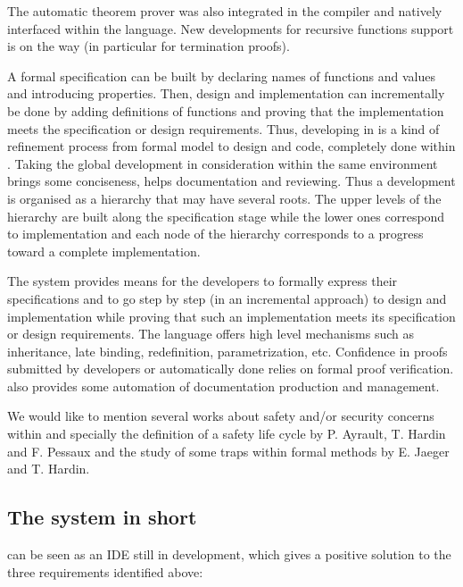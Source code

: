 The {\zenon} automatic theorem prover was also integrated in the
compiler and natively interfaced within the {\focalize} language. New
developments for recursive functions support is on the way (in particular for
termination proofs).

A formal specification can be built by declaring names of functions
and values and introducing
properties. Then, design and implementation can incrementally be done
by adding definitions of functions and proving that the implementation
meets the specification or design requirements. Thus, developing in
{\focalize} is a kind of refinement process from  formal model to design
and code, completely done within {\focalize}. Taking the global development
in consideration within the same environment brings some conciseness,
helps documentation and reviewing.
Thus a {\focalize} development is organised as a hierarchy that may have
several roots. The upper levels of the hierarchy are built along the
specification stage while the lower ones correspond to
implementation and each  node of the hierarchy corresponds to a progress
toward a complete implementation.

The {\focalize} system provides means for the developers to formally express
their specifications and to go step by step (in an incremental approach) to
design and implementation while proving that such an implementation
meets its specification or design requirements. The {\focalize} language offers
high level mechanisms such as inheritance, late binding, redefinition,
parametrization, etc.  Confidence in proofs submitted by developers or
automatically done relies on formal proof verification. {\focalize} also
provides some automation of documentation production and management.

We would like to mention several works about safety and/or security
concerns within {\focalize} and specially the definition of a safety life
cycle by P. Ayrault, T. Hardin and F. Pessaux \cite{TTSS08} and the
study of some traps within formal methods by E. Jaeger and
T. Hardin\cite{traps}.

\subsection*{The {\focalize} system in short}

{\focalize} can be seen as an IDE still in development, which
gives a positive solution to the three requirements identified above:

